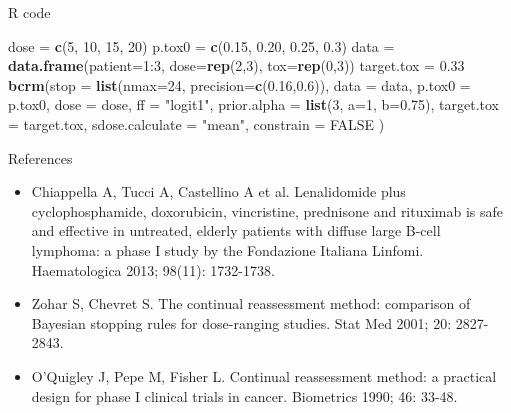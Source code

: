 \documentclass{beamer}
\newenvironment{Shaded}{}{}
\newcommand{\KeywordTok}[1]{\textcolor[rgb]{0.00,0.44,0.13}{\textbf{{#1}}}}
\newcommand{\DataTypeTok}[1]{\textcolor[rgb]{0.56,0.13,0.00}{{#1}}}
\newcommand{\DecValTok}[1]{\textcolor[rgb]{0.25,0.63,0.44}{{#1}}}
\newcommand{\FloatTok}[1]{\textcolor[rgb]{0.25,0.63,0.44}{{#1}}}
\newcommand{\StringTok}[1]{\textcolor[rgb]{0.25,0.44,0.63}{{#1}}}
\newcommand{\OtherTok}[1]{\textcolor[rgb]{0.00,0.44,0.13}{{#1}}}
\newcommand{\NormalTok}[1]{{#1}}
\begin{document}
\begin{frame}[fragile]{R code}

\begin{Shaded}
\begin{Highlighting}
\NormalTok{dose =}\StringTok{ }\KeywordTok{c}\NormalTok{(}\DecValTok{5}\NormalTok{, }\DecValTok{10}\NormalTok{, }\DecValTok{15}\NormalTok{, }\DecValTok{20}\NormalTok{)}
\NormalTok{p.tox0 =}\StringTok{ }\KeywordTok{c}\NormalTok{(}\FloatTok{0.15}\NormalTok{, }\FloatTok{0.20}\NormalTok{, }\FloatTok{0.25}\NormalTok{, }\FloatTok{0.3}\NormalTok{)}
\NormalTok{data =}\StringTok{ }\KeywordTok{data.frame}\NormalTok{(}\DataTypeTok{patient=}\DecValTok{1}\NormalTok{:}\DecValTok{3}\NormalTok{, }\DataTypeTok{dose=}\KeywordTok{rep}\NormalTok{(}\DecValTok{2}\NormalTok{,}\DecValTok{3}\NormalTok{), }\DataTypeTok{tox=}\KeywordTok{rep}\NormalTok{(}\DecValTok{0}\NormalTok{,}\DecValTok{3}\NormalTok{))}
\NormalTok{target.tox =}\StringTok{ }\FloatTok{0.33}
\KeywordTok{bcrm}\NormalTok{(}\DataTypeTok{stop =} \KeywordTok{list}\NormalTok{(}\DataTypeTok{nmax=}\DecValTok{24}\NormalTok{, }\DataTypeTok{precision=}\KeywordTok{c}\NormalTok{(}\FloatTok{0.16}\NormalTok{,}\FloatTok{0.6}\NormalTok{)), }
     \DataTypeTok{data =} \NormalTok{data, }
     \DataTypeTok{p.tox0 =} \NormalTok{p.tox0, }
     \DataTypeTok{dose =} \NormalTok{dose, }
     \DataTypeTok{ff =} \StringTok{"logit1"}\NormalTok{,}
     \DataTypeTok{prior.alpha =} \KeywordTok{list}\NormalTok{(}\DecValTok{3}\NormalTok{, }\DataTypeTok{a=}\DecValTok{1}\NormalTok{, }\DataTypeTok{b=}\FloatTok{0.75}\NormalTok{),}
     \DataTypeTok{target.tox =} \NormalTok{target.tox,}
     \DataTypeTok{sdose.calculate =} \StringTok{"mean"}\NormalTok{,}
     \DataTypeTok{constrain =} \OtherTok{FALSE}
     \NormalTok{)}
\end{Highlighting}
\end{Shaded}

\end{frame}

\begin{frame}{References}

\begin{itemize}
\item
  Chiappella A, Tucci A, Castellino A et al. Lenalidomide plus
  cyclophosphamide, doxorubicin, vincristine, prednisone and rituximab
  is safe and effective in untreated, elderly patients with diffuse
  large B-cell lymphoma: a phase I study by the Fondazione Italiana
  Linfomi. Haematologica 2013; 98(11): 1732-1738.
\item
  Zohar S, Chevret S. The continual reassessment method: comparison of
  Bayesian stopping rules for dose-ranging studies. Stat Med 2001; 20:
  2827-2843.
\item
  O'Quigley J, Pepe M, Fisher L. Continual reassessment method: a
  practical design for phase I clinical trials in cancer. Biometrics
  1990; 46: 33-48.
\end{itemize}

\end{frame}
\end{document}
